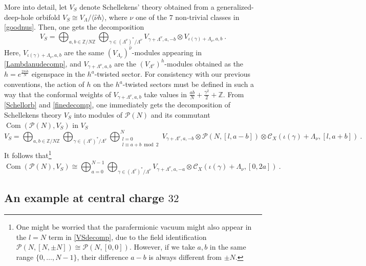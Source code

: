 \documentclass[11pt,reqno]{article}
\newcommand{\be}{\begin{equation}}
\newcommand{\ee}{\end{equation}}
\newcommand{\calC}{\mathcal{C}}
\DeclareMathOperator{\Com}{Com}
\newcommand{\ZZ}{\mathbb{Z}}
\newcommand{\paraf}{\mathcal{P}}
\begin{document}
 More into detail, let $V_S$ denote Schellekens' theory obtained from a generalized-deep-hole orbifold $V_S\cong V_\Lambda/\langle \hat\nu h\rangle$, where $\nu$ one of the $7$ non-trivial classes in \eqref{goodnus}. Then, one gets the decomposition
 \be\label{Schellorb} V_S=\bigoplus_{a,b\in \ZZ/N\ZZ} \bigoplus_{\gamma\in (\Lambda^\nu)^*/\Lambda^\nu} V_{\gamma+ \Lambda^\nu,a,-b}\otimes V_{\iota(\gamma)+\Lambda_\nu,a,b}\ .
 \ee Here, $V_{\iota(\gamma)+\Lambda_\nu,a,b}$ are the same $(V_{\Lambda_\nu})^{\hat\nu}$-modules appearing in \eqref{Lambdanudecomp}, and $V_{\gamma+ \Lambda^\nu,a,b}$ are the $(V_{\Lambda^\nu})^{h}$-modules obtained as the $h=e^{\frac{2\pi i b}{N}}$ eigenspace in the $h^a$-twisted sector. For consistency with our previous conventions, the action of $h$ on the $h^a$-twisted sectors must be defined in such a way that the conformal weights of $V_{\gamma+ \Lambda^\nu,a,b}$ take values in $\frac{ab}{N}+\frac{\gamma^2}{2}+\ZZ$. From \eqref{Schellorb} and \eqref{finedecomp}, one immediately gets the decomposition of Schellekens theory $V_S$ into modules of $\paraf(N)$ and its commutant $\Com(\paraf(N),V_S)$ in $V_S$
\be\label{VSdecomp}  V_S=\bigoplus_{a,b\in \ZZ/N\ZZ} \bigoplus_{\gamma\in (\Lambda^\nu)^*/\Lambda^\nu} \bigoplus_{\substack{l=0\\l\equiv a+b\bmod{2}}}^N  V_{\gamma+ \Lambda^\nu,a,-b}\otimes \paraf(N,[l,a-b])\otimes  \calC_X(\iota(\gamma)+\Lambda_\nu,[l,a+b])\ .\ee It follows that\footnote{One might be worried that the parafermionic vacuum might also appear in the $l=N$ term in \eqref{VSdecomp}, due to the field identification $\paraf(N,[N,\pm N])\cong \paraf(N,[0,0])$. However, if we take $a,b$ in the same range $\{0,\ldots, N-1\}$, their difference $a-b$ is always different from $\pm N$. }
\be \Com(\paraf(N),V_S)\cong  \bigoplus_{a=0}^{N-1} \bigoplus_{\gamma\in (\Lambda^\nu)^*/\Lambda^\nu}  V_{\gamma+ \Lambda^\nu,a,-a}\otimes   \calC_X(\iota(\gamma)+\Lambda_\nu,[0,2a]) \ .
\ee
 
\subsection{An example at central charge $32$}
\end{document}
